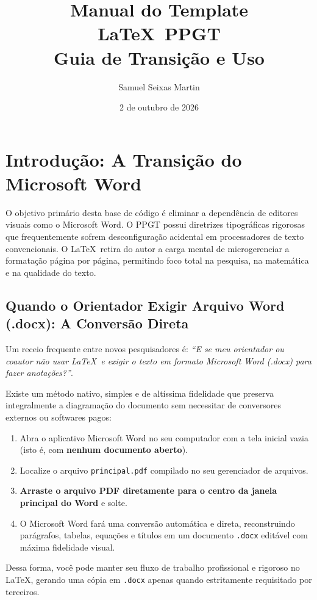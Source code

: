 \documentclass[a4paper,12pt]{article}
\title{Manual do Template \LaTeX \ PPGT \\ Guia de Transição e Uso}
\author{Samuel Seixas Martin}
\date{2 de outubro de 2026}
\begin{document}
\maketitle

\section{Introdução: A Transição do Microsoft Word}

O objetivo primário desta base de código é eliminar a dependência de editores visuais como o Microsoft Word. O PPGT possui diretrizes tipográficas rigorosas que frequentemente sofrem desconfiguração acidental em processadores de texto convencionais. O \LaTeX \ retira do autor a carga mental de microgerenciar a formatação página por página, permitindo foco total na pesquisa, na matemática e na qualidade do texto.

\subsection{Quando o Orientador Exigir Arquivo Word (.docx): A Conversão Direta}

Um receio frequente entre novos pesquisadores é: \textit{``E se meu orientador ou coautor não usar \LaTeX\ e exigir o texto em formato Microsoft Word (.docx) para fazer anotações?''}.

Existe um método nativo, simples e de altíssima fidelidade que preserva integralmente a diagramação do documento sem necessitar de conversores externos ou softwares pagos:

\begin{enumerate}
    \item Abra o aplicativo Microsoft Word no seu computador com a tela inicial vazia (isto é, com \textbf{nenhum documento aberto}).
    \item Localize o arquivo \texttt{principal.pdf} compilado no seu gerenciador de arquivos.
    \item \textbf{Arraste o arquivo PDF diretamente para o centro da janela principal do Word} e solte.
    \item O Microsoft Word fará uma conversão automática e direta, reconstruindo parágrafos, tabelas, equações e títulos em um documento \texttt{.docx} editável com máxima fidelidade visual.
\end{enumerate}

Dessa forma, você pode manter seu fluxo de trabalho profissional e rigoroso no \LaTeX, gerando uma cópia em \texttt{.docx} apenas quando estritamente requisitado por terceiros.
\end{document}
